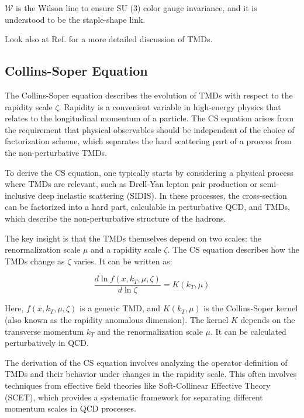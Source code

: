 \documentclass{article}
\begin{document}
$\mathcal{W}$ is the Wilson line to ensure SU (3) color gauge invariance, and it is understood to be the staple-shape link.

Look also at Ref.\cite{Collins:2011zzd} for a more detailed discussion of TMDs.

\subsection{Collins-Soper Equation}

The Collins-Soper equation describes the evolution of TMDs with respect to the rapidity scale $\zeta$. Rapidity is a convenient variable in
high-energy physics that relates to the longitudinal momentum of a particle. The CS equation arises from the requirement that physical observables
should be independent of the choice of factorization scheme, which separates the hard scattering part of a process from the non-perturbative TMDs.

To derive the CS equation, one typically starts by considering a physical process where TMDs are relevant, such as Drell-Yan lepton pair production
or semi-inclusive deep inelastic scattering (SIDIS). In these processes, the cross-section can be factorized into a hard part, calculable in
perturbative QCD, and TMDs, which describe the non-perturbative structure of the hadrons.

The key insight is that the TMDs themselves depend on two scales: the renormalization scale $\mu$ and a rapidity scale $\zeta$. The CS equation
describes how the TMDs change as $\zeta$ varies. It can be written as:

\begin{equation}
  \frac{d \ln f(x, k_T, \mu, \zeta)}{d \ln \zeta} = K(k_T, \mu)
  \label{eq:CS}
\end{equation}

Here, $f(x, k_T, \mu, \zeta)$ is a generic TMD, and $K(k_T, \mu)$ is the Collins-Soper kernel (also known as the rapidity anomalous dimension). The
kernel $K$ depends on the transverse momentum $k_T$ and the renormalization scale $\mu$. It can be calculated perturbatively in QCD.\@

The derivation of the CS equation involves analyzing the operator definition of TMDs and their behavior under changes in the rapidity scale. This
often involves techniques from effective field theories like Soft-Collinear Effective Theory (SCET), which provides a systematic framework for
separating different momentum scales in QCD processes.
\end{document}
